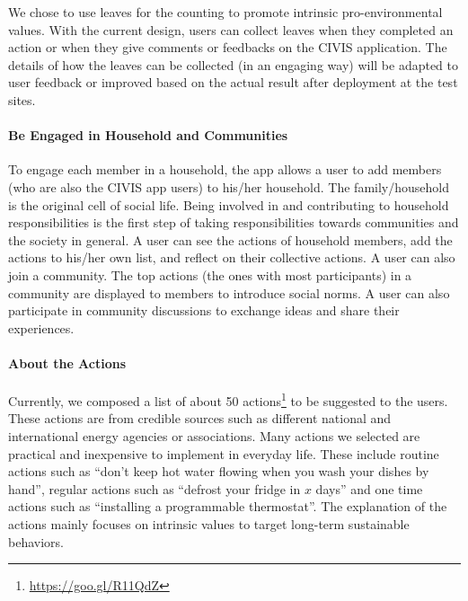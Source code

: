We chose to use leaves for the counting to promote intrinsic pro-environmental values. With the current design, users can collect leaves when they completed an action or when they give comments or feedbacks on the CIVIS application. The details of how the leaves can be collected (in an engaging way) will be adapted to user feedback or improved based on the actual result after deployment at the test sites. 

\paragraph{Be Engaged in Household and Communities}

To engage each member in a household, the app allows a user to add members (who are also the CIVIS app users) to his/her household. The family/household is the original cell of social life. Being involved in and contributing to household responsibilities is the first step of taking responsibilities towards communities and the society in general. 
A user can see the actions of household members, add the actions to his/her own list, and reflect on their collective actions.
% 
A user can also join a community. The top actions (the ones with most participants) in a community are displayed to members to introduce social norms. 
A user can also participate in community discussions to exchange ideas and share their experiences. 



\paragraph{About the Actions}
Currently, we composed a list of about 50 actions\footnote{\url{https://goo.gl/R11QdZ}} to be suggested to the users. These actions are from credible sources such as different national and international energy agencies or associations. Many actions we selected are practical and inexpensive to implement in everyday life. These include routine actions such as ``don't keep hot water flowing when you wash your dishes by hand'', regular actions such as ``defrost your fridge in $x$ days'' and one time actions such as ``installing a programmable thermostat''.  The explanation of the actions mainly focuses on intrinsic values to target long-term sustainable behaviors. 

